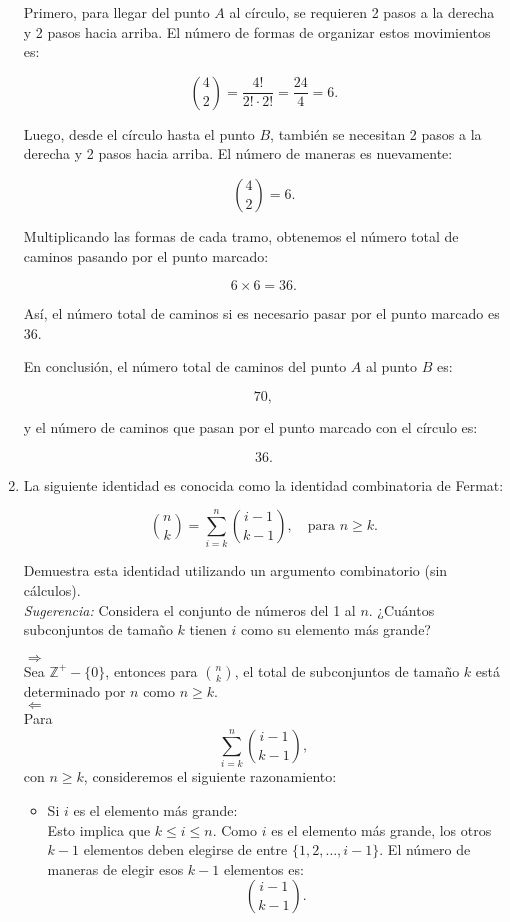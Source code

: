 \documentclass{article}
\begin{document}
\begin{enumerate}
Primero, para llegar del punto \(A\) al círculo, se requieren 2 pasos a la derecha y 2 pasos hacia arriba. El número de formas de organizar estos movimientos es:

\[
\binom{4}{2} = \frac{4!}{2! \cdot 2!} = \frac{24}{4} = 6.
\]

Luego, desde el círculo hasta el punto \(B\), también se necesitan 2 pasos a la derecha y 2 pasos hacia arriba. El número de maneras es nuevamente:

\[
\binom{4}{2} = 6.
\]

Multiplicando las formas de cada tramo, obtenemos el número total de caminos pasando por el punto marcado:

\[
6 \times 6 = 36.
\]

Así, el número total de caminos si es necesario pasar por el punto marcado es \(36\).

\medskip

En conclusión, el número total de caminos del punto \(A\) al punto \(B\) es:

\[
70,
\]

y el número de caminos que pasan por el punto marcado con el círculo es:

\[
36.
\]

		\item La siguiente identidad es conocida como la identidad combinatoria de Fermat:

			\[
			\binom{n}{k} = \sum_{i=k}^{n} \binom{i-1}{k-1}, \quad \text{para } n \geq k.
			\]

	Demuestra esta identidad utilizando un argumento combinatorio (sin cálculos). \\
\textit{Sugerencia:} Considera el conjunto de números del 1 al \( n \). ¿Cuántos subconjuntos de tamaño \( k \) tienen \( i \) como su elemento más grande?

$\Rightarrow$\\
Sea \(\mathbb{Z}^+ - \{0\}\), entonces para \(\binom{n}{k}\), el total de subconjuntos de tamaño \(k\) está determinado por \(n\) como \(n \geq k\).\\

$\Leftarrow$\\
Para
\[
\sum_{i=k}^n \binom{i-1}{k-1},
\]
con \(n \geq k\), consideremos el siguiente razonamiento:

\begin{itemize}
    \item Si \(i\) es el elemento más grande:\\
    Esto implica que \(k \leq i \leq n\). Como \(i\) es el elemento más grande, los otros \(k-1\) elementos deben elegirse de entre \(\{1, 2, \dots, i-1\}\).  
    El número de maneras de elegir esos \(k-1\) elementos es:
    \[
    \binom{i-1}{k-1}.
    \]
\end{itemize}


\end{enumerate}
\end{document}
